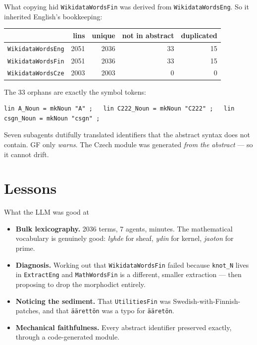 \documentclass[10pt,aspectratio=169]{beamer}
\newcommand{\bad}[1]{\textcolor{warn}{#1}}
\newcommand{\ok}[1]{\textcolor{good}{#1}}
\begin{document}
\begin{frame}[fragile]{What copying hid}
  \texttt{WikidataWordsFin} was derived from \texttt{WikidataWordsEng}. So it
  inherited English's bookkeeping:

  \vspace{0.5em}
  \begin{center}
  \begin{tabular}{lrrrr}
    \toprule
    & lins & unique & \bad{not in abstract} & \bad{duplicated} \\
    \midrule
    \texttt{WikidataWordsEng} & 2051 & 2036 & 33 & 15 \\
    \texttt{WikidataWordsFin} & 2051 & 2036 & 33 & 15 \\
    \midrule
    \texttt{WikidataWordsCze} & \ok{2003} & \ok{2003} & \ok{0} & \ok{0} \\
    \bottomrule
  \end{tabular}
  \end{center}

  \vspace{0.3em}
  The 33 orphans are exactly the symbol tokens:

\begin{lstlisting}
lin A_Noun = mkNoun "A" ;   lin C222_Noun = mkNoun "C222" ;   lin csgn_Noun = mkNoun "csgn" ;
\end{lstlisting}

  \vspace{0.2em}
  \footnotesize
  Seven subagents dutifully translated identifiers that the abstract syntax does
  not contain. GF only \emph{warns}.
  The Czech module was generated \emph{from the abstract} --- so it cannot drift.
\end{frame}

\section{Lessons}

\begin{frame}{What the LLM was good at}
  \begin{itemize}
    \item \textbf{Bulk lexicography.} 2036 terms, 7 agents, minutes.
          The mathematical vocabulary is genuinely good: \emph{lyhde} for sheaf,
          \emph{ydin} for kernel, \emph{jaoton} for prime.
    \item \textbf{Diagnosis.} Working out that \texttt{WikidataWordsFin} failed
          because \texttt{knot\_N} lives in \texttt{ExtractEng} and
          \texttt{MathWordsFin} is a different, smaller extraction ---
          then proposing to drop the morphodict entirely.
    \item \textbf{Noticing the sediment.} That \texttt{UtilitiesFin} was
          Swedish-with-Finnish-patches, and that \texttt{äärettön} was a typo
          for \texttt{ääretön}.
    \item \textbf{Mechanical faithfulness.} Every abstract identifier preserved
          exactly, through a code-generated module.
  \end{itemize}
\end{frame}
\end{document}
